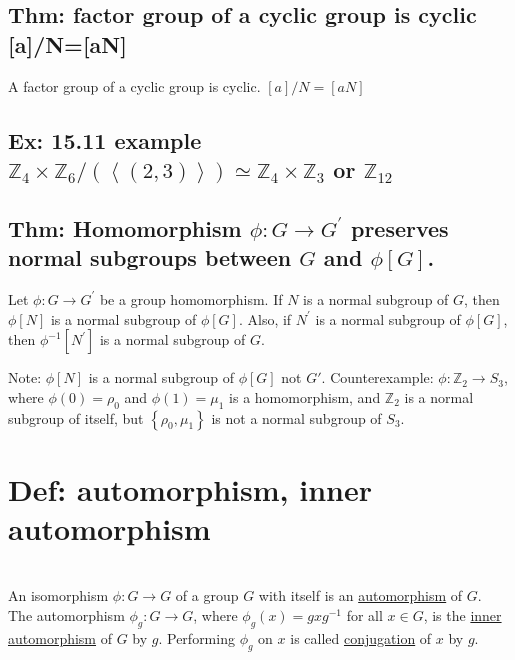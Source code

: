\documentclass[11pt]{elegantbook}
\begin{document}
\subsection{Thm: factor group of a cyclic group is cyclic [a]/N=[aN]}
\begin{theorem}
    A factor group of a cyclic group is cyclic. $[a]/N=[aN]$
\end{theorem}

\subsection{Ex: 15.11 example $\mathbb{Z}_4\times \mathbb{Z}_6/(\left\langle (2,3)\right\rangle)\simeq \mathbb{Z}_4\times \mathbb{Z}_3$ or $\mathbb{Z}_{12}$}



\subsection{Thm: Homomorphism $\phi: G \rightarrow G^{\prime}$ preserves normal subgroups between $G$ and $\phi[G]$.}
\begin{theorem}
    Let $\phi: G \rightarrow G^{\prime}$ be a group homomorphism. If $N$ is a normal subgroup of $G$, then $\phi[N]$ is a normal subgroup of $\phi[G]$. Also, if $N^{\prime}$ is a normal subgroup of $\phi[G]$, then $\phi^{-1}\left[N^{\prime}\right]$ is a normal subgroup of $G$.
\end{theorem}
Note: $\phi[N]$ is a normal subgroup of $\phi[G]$ not $G'$. Counterexample: $\phi: \mathbb{Z}_{2} \rightarrow S_{3}$, where $\phi(0)=\rho_{0}$ and $\phi(1)=\mu_{1}$ is a homomorphism, and $\mathbb{Z}_{2}$ is a normal subgroup of itself, but $\left\{\rho_{0}, \mu_{1}\right\}$ is not a normal subgroup of $S_{3}$.





\section{Def: automorphism, inner automorphism}
\begin{definition}
    \quad\\
    An isomorphism $\phi : G \rightarrow G$ of a group $G$ with itself is an \underline{automorphism} of $G$.\\
    The automorphism $\phi_g : G \rightarrow G$, where $\phi_g(x) = gxg^{-1}$ for all $x \in G$, is the \underline{inner automorphism} of $G$ by $g$. Performing $\phi_g$ on $x$ is called \underline{conjugation} of $x$ by $g$.
\end{definition}
\end{document}
